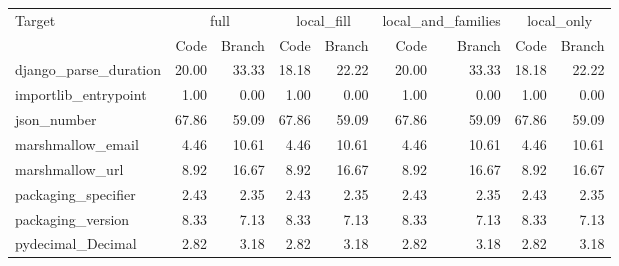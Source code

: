 \begin{tabular}{lrrrrrrrr}
\toprule
Target & \multicolumn{2}{c}{full} & \multicolumn{2}{c}{local\_fill} & \multicolumn{2}{c}{local\_and\_families} & \multicolumn{2}{c}{local\_only} \\
 & Code & Branch & Code & Branch & Code & Branch & Code & Branch \\
\midrule
django\_parse\_duration & 20.00 & 33.33 & 18.18 & 22.22 & 20.00 & 33.33 & 18.18 & 22.22 \\
importlib\_entrypoint & 1.00 & 0.00 & 1.00 & 0.00 & 1.00 & 0.00 & 1.00 & 0.00 \\
json\_number & 67.86 & 59.09 & 67.86 & 59.09 & 67.86 & 59.09 & 67.86 & 59.09 \\
marshmallow\_email & 4.46 & 10.61 & 4.46 & 10.61 & 4.46 & 10.61 & 4.46 & 10.61 \\
marshmallow\_url & 8.92 & 16.67 & 8.92 & 16.67 & 8.92 & 16.67 & 8.92 & 16.67 \\
packaging\_specifier & 2.43 & 2.35 & 2.43 & 2.35 & 2.43 & 2.35 & 2.43 & 2.35 \\
packaging\_version & 8.33 & 7.13 & 8.33 & 7.13 & 8.33 & 7.13 & 8.33 & 7.13 \\
pydecimal\_Decimal & 2.82 & 3.18 & 2.82 & 3.18 & 2.82 & 3.18 & 2.82 & 3.18 \\
\bottomrule
\end{tabular}
